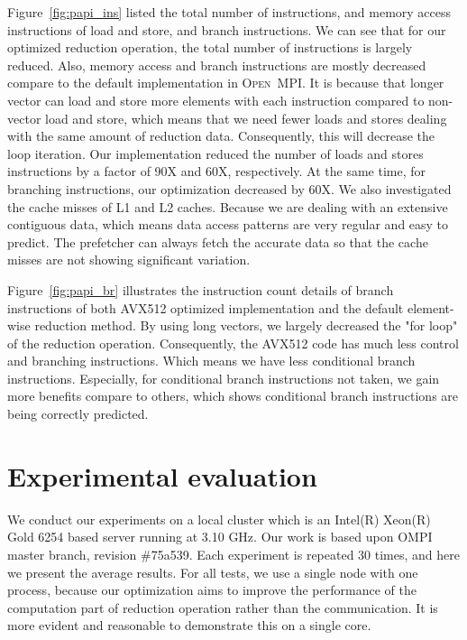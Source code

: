 \documentclass[sigconf]{acmart}
\newcommand{\ompi}[0]{\textsc{Open~MPI}\xspace}
\begin{document}
Figure~\ref{fig:papi_ins} listed the total number of instructions, and memory access instructions of
load and store, and branch instructions.
We can see that for our optimized reduction operation, the total number of
instructions is largely reduced. Also, memory access and branch instructions
are mostly decreased compare to the default implementation in \ompi.
It is because that longer vector can load and store more elements with each
instruction compared to non-vector load and store, which means that we need
fewer loads and stores dealing with the same amount of reduction data.
Consequently, this will decrease the loop iteration.
Our implementation reduced the number of loads and stores instructions by a factor of
90X and 60X, respectively.
At the same time, for branching instructions, our optimization decreased by 60X.
We also investigated the cache misses of L1 and L2 caches. Because we are dealing with an extensive contiguous
data, which means data access patterns are very regular and easy to predict.
The prefetcher can always fetch the accurate data so that the cache misses are not showing significant variation.

Figure~\ref{fig:papi_br} illustrates the instruction count details
of branch instructions of both AVX512 optimized implementation and the default
element-wise reduction method. By using long vectors, we largely decreased the "for loop" of the reduction
operation. Consequently, the AVX512 code has much less control and branching instructions.
Which means we have less conditional branch instructions.
Especially, for conditional branch instructions not taken, we gain
more benefits compare to others, which shows conditional branch instructions are being correctly predicted.


\section{Experimental evaluation}\label{sec:experiments}
We conduct our experiments on a local cluster which is an Intel(R) Xeon(R) Gold 6254 based server running at 3.10 GHz. Our work is based upon OMPI master branch, revision \#75a539. Each experiment is repeated 30 times, and here we present the average results. For all tests, we use a single node with one process, because our optimization aims to improve the performance of the computation part of reduction operation rather than the communication. It is more evident and reasonable to demonstrate this on a single core.
\end{document}
